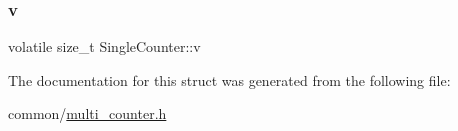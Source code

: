 \subsubsection{\texorpdfstring{v}{v}}
{\footnotesize\ttfamily volatile size\+\_\+t Single\+Counter\+::v}



The documentation for this struct was generated from the following file\+:\begin{DoxyCompactItemize}
\item 
common/\hyperlink{multi__counter_8h}{multi\+\_\+counter.\+h}\end{DoxyCompactItemize}
